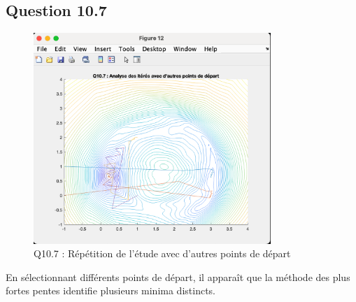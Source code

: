 \documentclass[12pt]{article}
\begin{document}
\subsection{Question 10.7}
\begin{figure}[H]
    \centering
    \includegraphics[width=0.8\textwidth]{Q10.7.png} 
    \caption{Q10.7 : Répétition de l'étude avec d'autres points de départ}
\end{figure}
En sélectionnant différents points de départ, il apparaît que la méthode des plus fortes pentes identifie plusieurs minima distincts.
\end{document}
